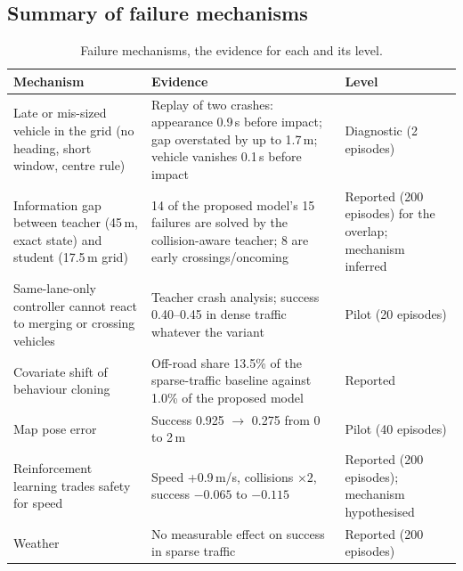 \subsection{Summary of failure mechanisms}
\begin{table}[H]\centering\small
\caption{Failure mechanisms, the evidence for each and its level.}\label{tab:mechanisms}
\begin{tabularx}{\textwidth}{@{}>{\raggedright\arraybackslash}p{4.4cm}X>{\raggedright\arraybackslash}p{2.6cm}@{}}\toprule
Mechanism & Evidence & Level\\\midrule
Late or mis-sized vehicle in the grid (no heading, short window, centre rule) & Replay of two crashes: appearance 0.9\,s before impact; gap overstated by up to 1.7\,m; vehicle vanishes 0.1\,s before impact & Diagnostic (2 episodes)\\
Information gap between teacher (45\,m, exact state) and student (17.5\,m grid) & 14 of the proposed model's 15 failures are solved by the collision-aware teacher; 8 are early crossings/oncoming & Reported (200 episodes) for the overlap; mechanism inferred\\
Same-lane-only controller cannot react to merging or crossing vehicles & Teacher crash analysis; success 0.40--0.45 in dense traffic whatever the variant & Pilot (20 episodes)\\
Covariate shift of behaviour cloning & Off-road share 13.5\% of the sparse-traffic baseline against 1.0\% of the proposed model & Reported\\
Map pose error & Success 0.925 $\to$ 0.275 from 0 to 2\,m & Pilot (40 episodes)\\
Reinforcement learning trades safety for speed & Speed +0.9\,m/s, collisions $\times2$, success $-0.065$ to $-0.115$ & Reported (200 episodes); mechanism hypothesised\\
Weather & No measurable effect on success in sparse traffic & Reported (200 episodes)\\\bottomrule
\end{tabularx}
\end{table}
